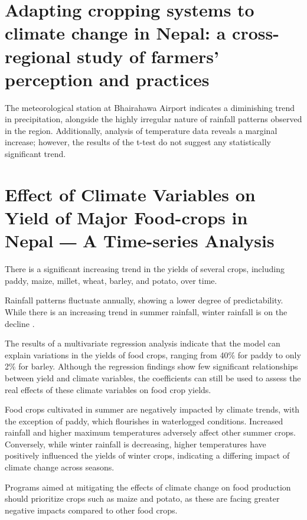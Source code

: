 \documentclass[a4paper,12pt]{article}
\begin{document}
\section{Adapting cropping systems to climate change in Nepal: a cross-regional study of farmers’ perception and practices}

\parencite{manandharAdaptingCroppingSystems2011}
The meteorological station at Bhairahawa Airport indicates a diminishing trend in precipitation, alongside the highly irregular nature of rainfall patterns observed in the region. Additionally, analysis of temperature data reveals a marginal increase; however, the results of the t-test do not suggest any statistically significant trend.


\section{Effect of Climate Variables on Yield of Major Food-crops in Nepal  ― A Time-series Analysis}
\parencite{maharjanEffectClimateVariables2013}
There is a significant increasing trend in the yields of several crops, including paddy, maize, millet, wheat, barley, and potato, over time. 

Rainfall patterns fluctuate annually, showing a lower degree of predictability. While there is an increasing trend in summer rainfall, winter rainfall is on the decline \parencite{maharjanEffectClimateVariables2013}. 

The results of a multivariate regression analysis indicate that the model can explain variations in the yields of food crops, ranging from 40\% for paddy to only 2\% for barley. Although the regression findings show few significant relationships between yield and climate variables, the coefficients can still be used to assess the real effects of these climate variables on food crop yields.

Food crops cultivated in summer are negatively impacted by climate trends, with the exception of paddy, which flourishes in waterlogged conditions. Increased rainfall and higher maximum temperatures adversely affect other summer crops. Conversely, while winter rainfall is decreasing, higher temperatures have positively influenced the yields of winter crops, indicating a differing impact of climate change across seasons. 

Programs aimed at mitigating the effects of climate change on food production should prioritize crops such as maize and potato, as these are facing greater negative impacts compared to other food crops.
\end{document}
